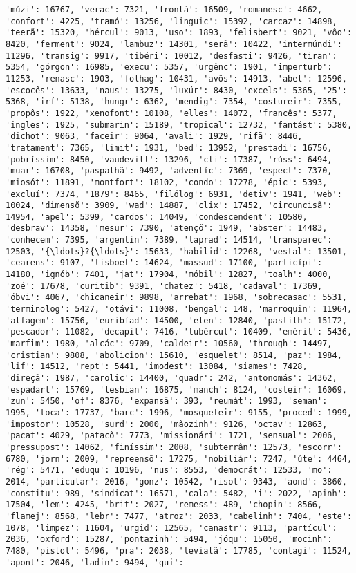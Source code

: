 \begin{Verbatim}[commandchars=\\\{\}]
'múzi': 16767, 'verac': 7321, 'frontã': 16509, 'romanesc': 4662, 'confort': 4225, 'tramó': 13256, 'linguic': 15392, 'carcaz': 14898, 'teerã': 15320, 'hércul': 9013, 'uso': 1893, 'felisbert': 9021, 'vôo': 8420, 'ferment': 9024, 'lambuz': 14301, 'serã': 10422, 'intermúndi': 11296, 'transig': 9917, 'tibéri': 10012, 'desfasti': 9426, 'tiran': 5354, 'górgon': 16985, 'execu': 5357, 'urgênc': 1901, 'imperturb': 11253, 'renasc': 1903, 'folhag': 10431, 'avôs': 14913, 'abel': 12596, 'escocês': 13633, 'naus': 13275, 'luxúr': 8430, 'excels': 5365, '25': 5368, 'irí': 5138, 'hungr': 6362, 'mendig': 7354, 'costureir': 7355, 'propôs': 1922, 'xenofont': 10108, 'elles': 14072, 'francês': 5377, 'ingles': 1925, 'submarin': 15189, 'tropical': 12732, 'fantást': 5380, 'dichot': 9063, 'faceir': 9064, 'avali': 1929, 'rifã': 8446, 'tratament': 7365, 'limit': 1931, 'bed': 13952, 'prestadi': 16756, 'pobríssim': 8450, 'vaudevill': 13296, 'cli': 17387, 'rúss': 6494, 'muar': 16708, 'paspalhã': 9492, 'adventíc': 7369, 'espect': 7370, 'miosót': 11891, 'montfort': 18102, 'condo': 17278, 'épic': 5393, 'excluí': 7374, '1879': 8465, 'filólog': 6931, 'detiv': 1941, 'web': 10024, 'dimensõ': 3909, 'wad': 14887, 'clix': 17452, 'circuncisã': 14954, 'apel': 5399, 'cardos': 14049, 'condescendent': 10580, 'desbrav': 14358, 'mesur': 7390, 'atençõ': 1949, 'abster': 14483, 'conhecem': 7395, 'argentin': 7389, 'laprad': 14514, 'transparec': 12503, '{\ldots}?{\ldots}': 15633, 'habilid': 12268, 'vestal': 13501, 'cearens': 9107, 'lisboet': 14624, 'massud': 17100, 'particípi': 14180, 'ignób': 7401, 'jat': 17904, 'móbil': 12827, 'toalh': 4000, 'zoé': 17678, 'curitib': 9391, 'chatez': 5418, 'cadaval': 17369, 'óbvi': 4067, 'chicaneir': 9898, 'arrebat': 1968, 'sobrecasac': 5531, 'terminolog': 5427, 'otávi': 11008, 'bengal': 148, 'marroquin': 11964, 'alfagem': 15756, 'euribíad': 14500, 'elen': 12840, 'pastilh': 15172, 'pescador': 11082, 'decapit': 7416, 'tubércul': 10409, 'emérit': 5436, 'marfim': 1980, 'alcác': 9709, 'caldeir': 10560, 'through': 14497, 'cristian': 9808, 'abolicion': 15610, 'esquelet': 8514, 'paz': 1984, 'lif': 14512, 'rept': 5441, 'imodest': 13084, 'siames': 7428, 'direçã': 1987, 'carolic': 14400, 'quadr': 242, 'antonomás': 14362, 'espadart': 15769, 'lesbian': 16875, 'manch': 8124, 'costeir': 16069, 'zun': 5450, 'of': 8376, 'expansã': 393, 'reumát': 1993, 'seman': 1995, 'toca': 17737, 'barc': 1996, 'mosqueteir': 9155, 'proced': 1999, 'impostor': 10528, 'surd': 2000, 'mãozinh': 9126, 'octav': 12863, 'pacat': 4029, 'patacõ': 7773, 'missionári': 1721, 'sensual': 2006, 'pressupost': 14062, 'finíssim': 2008, 'subterrân': 12573, 'escorr': 6780, 'jorn': 2009, 'repreensõ': 17275, 'nobiliár': 7247, 'úte': 4464, 'rég': 5471, 'eduqu': 10196, 'nus': 8553, 'democrát': 12533, 'mo': 2014, 'particular': 2016, 'gonz': 10542, 'risot': 9343, 'aond': 3860, 'constitu': 989, 'sindicat': 16571, 'cala': 5482, 'i': 2022, 'apinh': 17504, 'lem': 4245, 'brit': 2027, 'remess': 489, 'chopin': 8566, 'flamej': 8568, 'lebr': 7477, 'atroz': 2033, 'cabelinh': 7404, 'este': 1078, 'limpez': 11604, 'urgid': 12565, 'canastr': 9113, 'partícul': 2036, 'oxford': 15287, 'pontazinh': 5494, 'jóqu': 15050, 'mocinh': 7480, 'pistol': 5496, 'pra': 2038, 'leviatã': 17785, 'contagi': 11524, 'apont': 2046, 'ladin': 9494, 'gui': 
\end{Verbatim}
